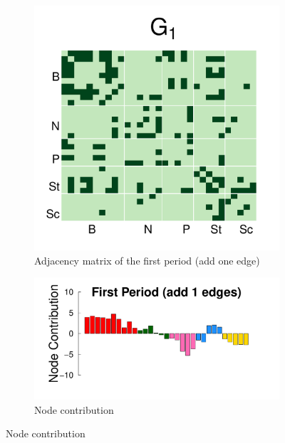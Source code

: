 \documentclass[12pt]{article}
\begin{document}
\begin{figure}[H]
	\centering
	\begin{subfigure}[b]{0.3\textwidth}
		\includegraphics[width=\textwidth]{../../Figure/sim_Adj1.pdf}
		\caption{Adjacency matrix of the first period (add one edge)}
		\label{fig:step1}
	\end{subfigure}
	\begin{subfigure}[b]{0.6\textwidth}
		\includegraphics[width=\textwidth]{../../Figure/step1.pdf}
		\caption{Node contribution}
		\label{fig:adj.step1}
	\end{subfigure}
\end{figure}
\end{document}
